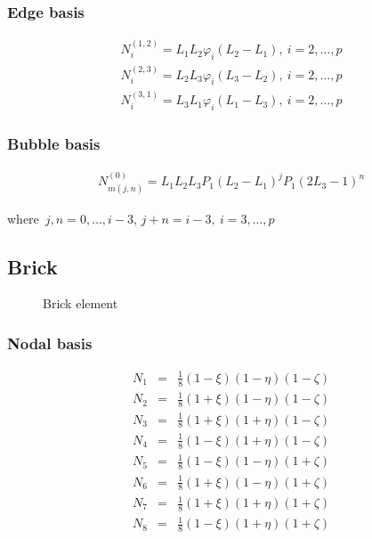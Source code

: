 \subsubsection{Edge basis}

\begin{eqnarray*}
N_i^{(1,2)}=L_1L_2\varphi_i(L_2-L_1),\ i=2,\ldots,p \\
N_i^{(2,3)}=L_2L_3\varphi_i(L_3-L_2),\ i=2,\ldots,p \\
N_i^{(3,1)}=L_3L_1\varphi_i(L_1-L_3),\ i=2,\ldots,p
\end{eqnarray*}

\subsubsection{Bubble basis}

\begin{eqnarray*}
N_{m(j,n)}^{(0)}=L_1L_2L_3 P_{1}(L_2-L_1)^{j}P_{1}(2L_3-1)^{n}
\end{eqnarray*}

\noindent where\ $j,n=0,\ldots,i-3$, $j+n=i-3,\ i=3,\ldots,p$

\subsection{Brick}

\begin{figure}[tbhp]
\begin{center}

\caption{Brick element}
\end{center}
\end{figure}

\subsubsection{Nodal basis}

\begin{eqnarray*}
N_1&=&\frac{1}{8}(1-\xi)(1-\eta)(1-\zeta) \\
N_2&=&\frac{1}{8}(1+\xi)(1-\eta)(1-\zeta) \\
N_3&=&\frac{1}{8}(1+\xi)(1+\eta)(1-\zeta) \\
N_4&=&\frac{1}{8}(1-\xi)(1+\eta)(1-\zeta) \\
N_5&=&\frac{1}{8}(1-\xi)(1-\eta)(1+\zeta) \\
N_6&=&\frac{1}{8}(1+\xi)(1-\eta)(1+\zeta) \\
N_7&=&\frac{1}{8}(1+\xi)(1+\eta)(1+\zeta) \\
N_8&=&\frac{1}{8}(1-\xi)(1+\eta)(1+\zeta)
\end{eqnarray*}

